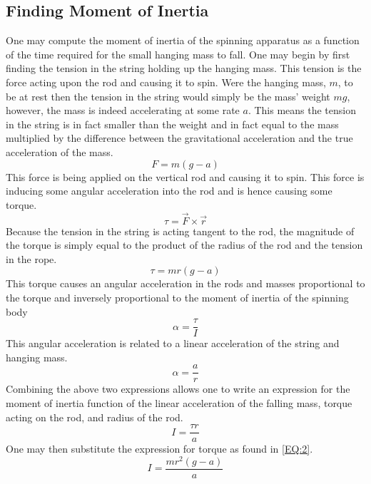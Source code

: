 \documentclass[11pt]{article}
\begin{document}
\subsection{Finding Moment of Inertia}
One may compute the moment of inertia of the spinning apparatus as a function of the time required for the small hanging mass to fall. 
One may begin by first finding the tension in the string holding up the hanging mass. This tension is the force acting upon the rod and causing it to spin. Were the hanging mass, \(m\), to be at rest then the tension in the string would simply be the mass' weight \(m g\), however, the mass is indeed accelerating at some rate \(a\). This means the tension in the string is in fact smaller than the weight and in fact equal to the mass multiplied by the difference between the gravitational acceleration and the true acceleration of the mass.
\begin{equation}
F = m \left( g - a \right)
\end{equation}
This force is being applied on the vertical rod and causing it to spin. This force is inducing some angular acceleration into the rod and is hence causing some torque.
\begin{equation}
\tau = \vec{F} \times \vec{r}
\end{equation}
Because the tension in the string is acting tangent to the rod, the magnitude of the torque is simply equal to the product of the radius of the rod and the tension in the rope.
\begin{equation}
\tau = m r \left(g - a\right) \label{EQ:2}
\end{equation}
This torque causes an angular acceleration in the rods and masses proportional to the torque and inversely proportional to the moment of inertia of the spinning body
\begin{equation}
\alpha = \frac{\tau}{I}
\end{equation}
This angular acceleration is related to a linear acceleration of the string and hanging mass.
\begin{equation}
\alpha = \frac{a}{r}
\end{equation}
Combining the above two expressions allows one to write an expression for the moment of inertia function of the linear acceleration of the falling mass, torque acting on the rod, and radius of the rod.
\begin{equation}
I = \frac{\tau r}{a}
\end{equation}
One may then substitute the expression for torque as found in \eqref{EQ:2}.
\begin{equation}
I = \frac{m r^2 \left(g - a\right)}{a} \label{EQ:3}
\end{equation}
\end{document}
